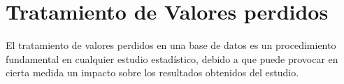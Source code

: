 \documentclass[12pt,oneside]{book}\usepackage[]{graphicx}\usepackage[]{color}
\theoremstyle{definition} %
\begin{document}




























\section{Tratamiento de Valores perdidos}
\label{sec:limpieza}
El tratamiento de valores perdidos en una base de datos es un procedimiento fundamental en cualquier estudio estadístico, debido a que puede provocar en cierta medida un impacto sobre los resultados obtenidos del estudio.
\end{document}
